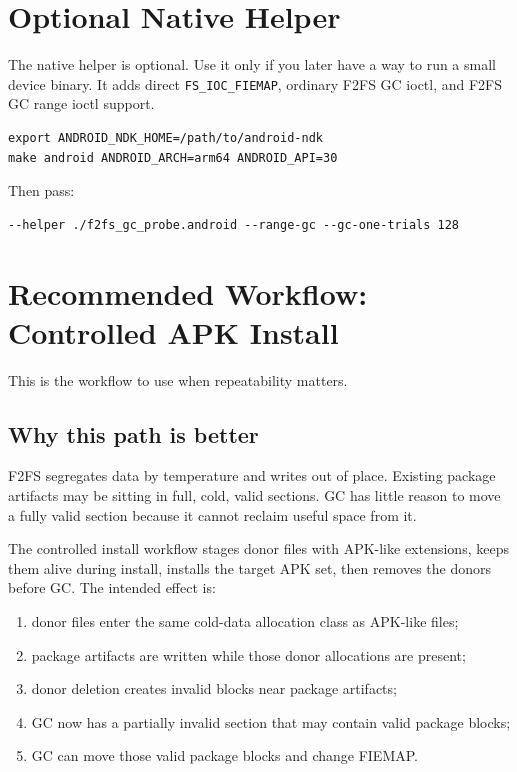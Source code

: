 \documentclass[11pt]{article}
\begin{document}
\section{Optional Native Helper}

The native helper is optional.  Use it only if you later have a way to run a
small device binary.  It adds direct \texttt{FS\_IOC\_FIEMAP}, ordinary F2FS GC
ioctl, and F2FS GC range ioctl support.

\begin{verbatim}
export ANDROID_NDK_HOME=/path/to/android-ndk
make android ANDROID_ARCH=arm64 ANDROID_API=30
\end{verbatim}

Then pass:

\begin{verbatim}
--helper ./f2fs_gc_probe.android --range-gc --gc-one-trials 128
\end{verbatim}

\section{Recommended Workflow: Controlled APK Install}

This is the workflow to use when repeatability matters.

\subsection{Why this path is better}

F2FS segregates data by temperature and writes out of place.  Existing package
artifacts may be sitting in full, cold, valid sections.  GC has little reason to
move a fully valid section because it cannot reclaim useful space from it.

The controlled install workflow stages donor files with APK-like extensions,
keeps them alive during install, installs the target APK set, then removes the
donors before GC.  The intended effect is:

\begin{enumerate}[nosep]
\item donor files enter the same cold-data allocation class as APK-like files;
\item package artifacts are written while those donor allocations are present;
\item donor deletion creates invalid blocks near package artifacts;
\item GC now has a partially invalid section that may contain valid package
      blocks;
\item GC can move those valid package blocks and change FIEMAP.
\end{enumerate}
\end{document}
